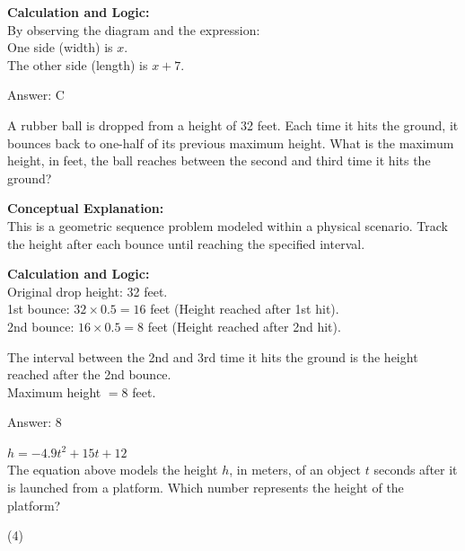 \documentclass[11pt,paper=a4,answers]{exam}
\begin{document}
\begin{questions}
\begin{solution}
\vspace{20pt}

\textbf{Calculation and Logic:} \\
By observing the diagram and the expression: \\
One side (width) is $x$. \\
The other side (length) is $x+7$.

\vspace{25pt}

Answer: \colorbox{yellow!100}{C}
\end{solution}

\vspace{40pt}

\question
A rubber ball is dropped from a height of 32 feet. Each time it hits the ground, it bounces back to one-half of its previous maximum height. What is the maximum height, in feet, the ball reaches between the second and third time it hits the ground?

\begin{solution}
\textbf{Conceptual Explanation:} \\
This is a geometric sequence problem modeled within a physical scenario. Track the height after each bounce until reaching the specified interval.

\vspace{20pt}

\textbf{Calculation and Logic:} \\
Original drop height: 32 feet. \\
1st bounce: $32 \times 0.5 = 16$ feet (Height reached after 1st hit). \\
2nd bounce: $16 \times 0.5 = 8$ feet (Height reached after 2nd hit).

\vspace{10pt}

The interval between the 2nd and 3rd time it hits the ground is the height reached after the 2nd bounce. \\
Maximum height $= 8$ feet.

\vspace{25pt}

Answer: \colorbox{yellow!100}{8}
\end{solution}

\vspace{40pt}

\question
$h = -4.9t^2 + 15t + 12$ \\
The equation above models the height $h$, in meters, of an object $t$ seconds after it is launched from a platform. Which number represents the height of the platform?
\begin{tasks}(4)
\end{tasks}


\end{questions}
\end{document}
